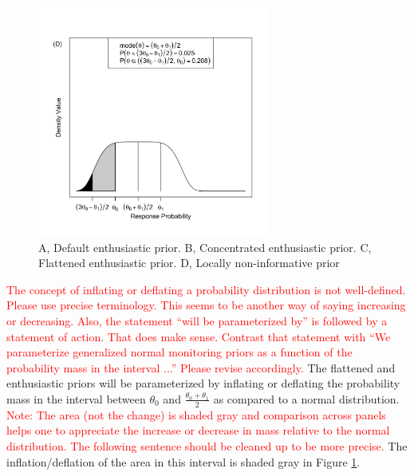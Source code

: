 \documentclass[useAMS,usenatbib,referee]{biom}
\begin{document}
\begin{figure}
\begin{center}
\includegraphics[width=3in]{figure1d.png}
\caption{A, Default enthusiastic prior. B, Concentrated enthusiastic prior. C, Flattened enthusiastic prior. D, Locally non-informative prior}

\label{fig:figure1}
\end{center}
\end{figure}
\textcolor{red}{The concept of inflating or deflating a probability distribution is not well-defined. Please use precise terminology. This seems to be another way of saying
increasing or decreasing. Also, the statement ``will be parameterized by'' is followed by a statement of action. That does make sense. Contrast that statement with ``We
parameterize generalized normal monitoring priors as a function of the probability mass in the interval ...'' Please revise accordingly.}
%
The flattened and enthusiastic priors will be parameterized by inflating or deflating the probability mass in the interval between $\theta_0$ and $\frac{\theta_0+\theta_1}{2}$ as compared to a normal distribution. 
%
\textcolor{red}{Note: The area (not the change) is shaded gray and comparison across panels helps one to appreciate the increase or decrease in mass relative to the normal distribution.
The following sentence should be cleaned up to be more precise.}
%
The inflation/deflation of the area in this interval is shaded gray in Figure \ref{fig:figure1}. 
%
\end{document}
